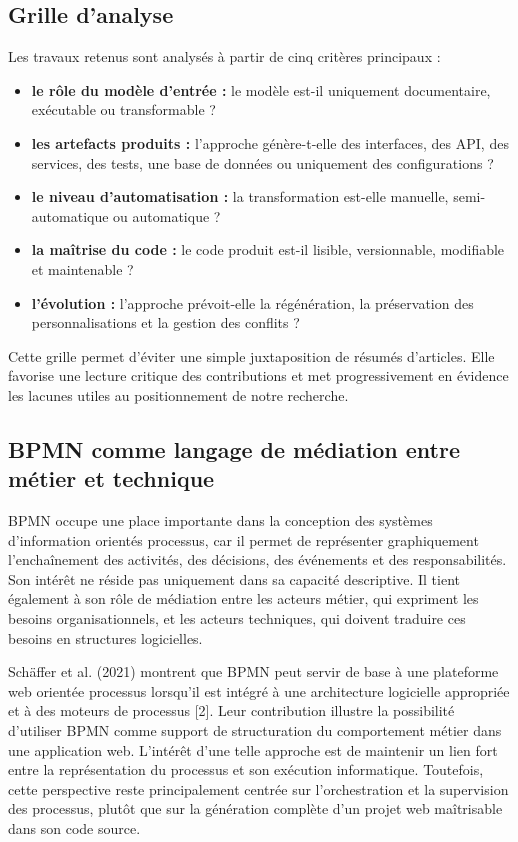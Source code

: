 \subsection{Grille d'analyse}

Les travaux retenus sont analysés à partir de cinq critères principaux :

\begin{itemize}
    \item \textbf{le rôle du modèle d'entrée :} le modèle est-il uniquement documentaire, exécutable ou transformable ?
    \item \textbf{les artefacts produits :} l'approche génère-t-elle des interfaces, des API, des services, des tests, une base de données ou uniquement des configurations ?
    \item \textbf{le niveau d'automatisation :} la transformation est-elle manuelle, semi-automatique ou automatique ?
    \item \textbf{la maîtrise du code :} le code produit est-il lisible, versionnable, modifiable et maintenable ?
    \item \textbf{l'évolution :} l'approche prévoit-elle la régénération, la préservation des personnalisations et la gestion des conflits ?
\end{itemize}

Cette grille permet d'éviter une simple juxtaposition de résumés d'articles. Elle favorise une lecture critique des contributions et met progressivement en évidence les lacunes utiles au positionnement de notre recherche.


\subsection{BPMN comme langage de médiation entre métier et technique}

BPMN occupe une place importante dans la conception des systèmes d'information orientés processus, car il permet de représenter graphiquement l'enchaînement des activités, des décisions, des événements et des responsabilités. Son intérêt ne réside pas uniquement dans sa capacité descriptive. Il tient également à son rôle de médiation entre les acteurs métier, qui expriment les besoins organisationnels, et les acteurs techniques, qui doivent traduire ces besoins en structures logicielles.

Schäffer et al. (2021) montrent que BPMN peut servir de base à une plateforme web orientée processus lorsqu'il est intégré à une architecture logicielle appropriée et à des moteurs de processus [2]. Leur contribution illustre la possibilité d'utiliser BPMN comme support de structuration du comportement métier dans une application web. L'intérêt d'une telle approche est de maintenir un lien fort entre la représentation du processus et son exécution informatique. Toutefois, cette perspective reste principalement centrée sur l'orchestration et la supervision des processus, plutôt que sur la génération complète d'un projet web maîtrisable dans son code source.

